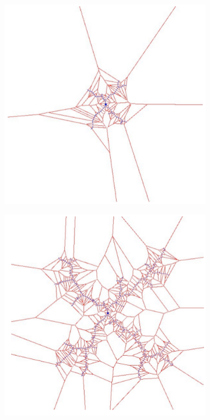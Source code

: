 \begin{figure}[h!]
\begin{subfigure}{.3\textwidth}
		\includegraphics[width=\textwidth]{figures/ch04_voron2.png}
	\end{subfigure}
	\begin{subfigure}{.3\textwidth}
		\includegraphics[width=\textwidth]{figures/ch04_voron3.png}

\end{subfigure}
\end{figure}
